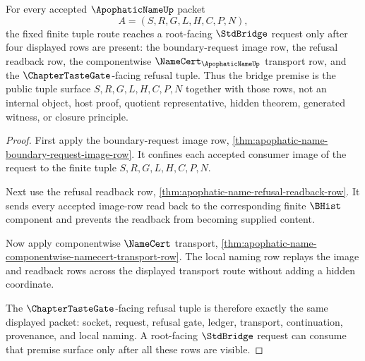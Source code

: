 \begin{theorem}
\label{thm:apophatic-name-root-stdbridge-premise-surface}
For every accepted $\ApophaticNameUp$ packet
$$
A=(S,R,G,L,H,C,P,N),
$$
the fixed finite tuple route reaches a root-facing $\StdBridge$ request only after four displayed rows are present: the boundary-request image row, the refusal readback row, the componentwise $\NameCert_{\ApophaticNameUp}$ transport row, and the $\ChapterTasteGate$-facing refusal tuple. Thus the bridge premise is the public tuple surface $S,R,G,L,H,C,P,N$ together with those rows, not an internal object, host proof, quotient representative, hidden theorem, generated witness, or closure principle.
\end{theorem}
\begin{proof}
First apply the boundary-request image row, \autoref{thm:apophatic-name-boundary-request-image-row}. It confines each accepted consumer image of the request to the finite tuple $S,R,G,L,H,C,P,N$.

Next use the refusal readback row, \autoref{thm:apophatic-name-refusal-readback-row}. It sends every accepted image-row read back to the corresponding finite $\BHist$ component and prevents the readback from becoming supplied content.

Now apply componentwise $\NameCert$ transport, \autoref{thm:apophatic-name-componentwise-namecert-transport-row}. The local naming row replays the image and readback rows across the displayed transport route without adding a hidden coordinate.

The $\ChapterTasteGate$-facing refusal tuple is therefore exactly the same displayed packet: socket, request, refusal gate, ledger, transport, continuation, provenance, and local naming. A root-facing $\StdBridge$ request can consume that premise surface only after all these rows are visible.
\end{proof}


